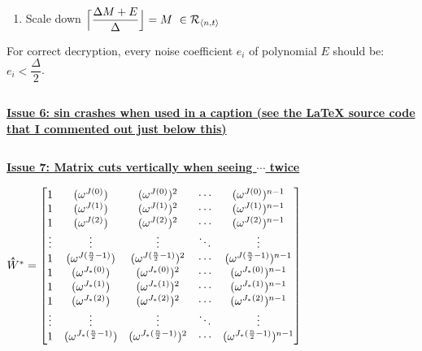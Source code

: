 \begin{tcolorbox}[title={\textbf{\tboxlabel{\ref*{subsec:glwe-alternative}} An Alternative GLWE Cryptosystem}}]
\begin{enumerate}
\item Scale down 
$\Bigl\lceil \dfrac{ \Delta  M + E }{\Delta}\Bigr\rfloor = M  \text{ } \in \mathcal{R}_{\langle n, t \rangle}$

\end{enumerate}

For correct decryption, every noise coefficient $e_i$ of polynomial $E$ should be: $e_i < \dfrac{\Delta}{2}$.

\end{tcolorbox}

$ $

\underline{\textbf{Issue 6: sin crashes when used in a caption (see the LaTeX source code that I commented out just below this)}}


$ $

\underline{\textbf{Issue 7: Matrix cuts vertically when seeing $\cdots$ twice}}

\noindent $\hathat{W}^* = \begin{bmatrix}
1 & (\omega^{J(0)}) & (\omega^{J(0)})^2 & \cdots & (\omega^{J(0)})^{n-1}\\
1 & (\omega^{J(1)}) & (\omega^{J(1)})^2 & \cdots & (\omega^{J(1)})^{n-1}\\
1 & (\omega^{J(2)}) & (\omega^{J(2)})^2 & \cdots & (\omega^{J(2)})^{n-1}\\
\vdots & \vdots & \vdots & \ddots & \vdots \\
1 & (\omega^{J(\frac{n}{2}-1)}) & (\omega^{J(\frac{n}{2}-1)})^2 & \cdots & (\omega^{J(\frac{n}{2}-1)})^{n-1}\\
1 & (\omega^{J_*(0)}) & (\omega^{J_*(0)})^2 & \cdots & (\omega^{J_*(0)})^{n-1}\\
1 & (\omega^{J_*(1)}) & (\omega^{J_*(1)})^2 & \cdots & (\omega^{J_*(1)})^{n-1}\\
1 & (\omega^{J_*(2)}) & (\omega^{J_*(2)})^2 & \cdots & (\omega^{J_*(2)})^{n-1}\\
\vdots & \vdots & \vdots & \ddots & \vdots \\
1 & (\omega^{J_*(\frac{n}{2}-1)}) & (\omega^{J_*(\frac{n}{2}-1)})^2 & \cdots & (\omega^{J_*(\frac{n}{2}-1)})^{n-1}\\
\end{bmatrix}$

